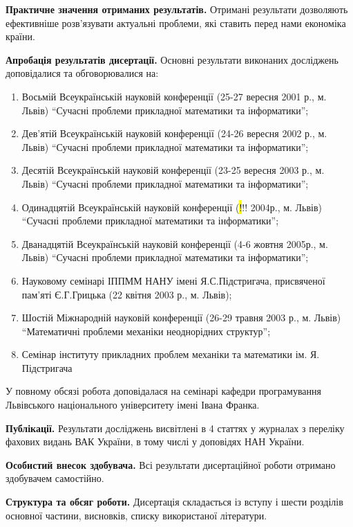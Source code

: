 \textbf{Практичне значення отриманих результатів.} Отримані результати дозволяють ефективніше розв'язувати актуальні
проблеми, які ставить перед нами економіка країни.

\textbf{Апробація результатів дисертації.} Основні результати виконаних досліджень доповідалися та обговорювалися на:

\begin{enumerate}
\def\labelenumi{\arabic{enumi}.}
\item
  Восьмій Всеукраїнській науковій конференції (25-27 вересня 2001 р., м. Львів) ``Сучасні проблеми прикладної математики
  та інформатики'';
\item
  Дев'ятій Всеукраїнській науковій конференції (24-26 вересня 2002 р., м. Львів) ``Сучасні проблеми прикладної
  математики та інформатики'';
\item
  Десятій Всеукраїнській науковій конференції (23-25 вересня 2003 р., м. Львів) ``Сучасні проблеми прикладної математики
  та інформатики'';
\item
  Одинадцятій Всеукраїнській науковій конференції ({\hl !!! } 2004р., м. Львів) ``Сучасні проблеми прикладної
  математики та інформатики'';
\item
  Дванадцятій Всеукраїнській науковій конференції (4-6 жовтня 2005р., м. Львів) ``Сучасні проблеми прикладної математики
  та інформатики'';
\item
  Науковому семінарі ІППММ НАНУ імені Я.С.Підстригача, присвяченої пам'яті Є.Г.Грицька (22 квітня 2003 р., м. Львів);
\item
  Шостій Міжнародній науковій конференції (26-29 травня 2003 р., м. Львів) ``Математичні проблеми механіки неоднорідних
  структур'';
\item
  Семінар інституту прикладних проблем механіки та математики ім. Я. Підстригача
\end{enumerate}

У повному обсязі робота доповідалася на семінарі кафедри програмування Львівського національного університету імені
Івана Франка.

\textbf{Публікації.} Результати досліджень висвітлені в 4 статтях у журналах з переліку фахових видань ВАК України, в
тому числі у доповідях НАН України.

\textbf{Особистий внесок здобувача.} Всі результати дисертаційної роботи отримано здобувачем самостійно.

\textbf{Структура та обсяг роботи.} Дисертація складається із вступу і шести розділів основної частини, висновків,
списку використаної літератури.

